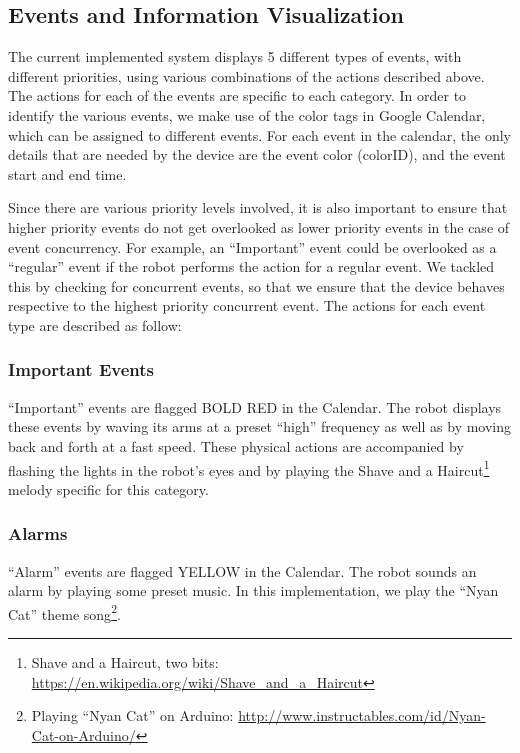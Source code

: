 \documentclass{sigchi-ext}
\begin{document}
\subsection{Events and Information Visualization}

The current implemented system displays 5 different types of events, with
different priorities, using various combinations of the actions described
above. The actions for each of the events are specific to each category. In
order to identify the various events, we make use of the color tags in Google
Calendar, which can be assigned to different events. For each event in the
calendar, the only details that are needed by the device are the event color
(colorID), and the event start and end time.

Since there are various priority levels involved, it is also important to
ensure that higher priority events do not get overlooked as lower priority
events in the case of event concurrency. For example, an ``Important'' event
could be overlooked as a ``regular'' event if the robot performs the action for
a regular event. We tackled this by checking for concurrent events, so that we
ensure that the device behaves respective to the highest priority concurrent
event. The actions for each event type are described as follow:

\subsubsection{Important Events}

``Important'' events are flagged BOLD RED in the Calendar. The robot displays
these events by waving its arms at a preset ``high'' frequency as well as by
moving back and forth at a fast speed. These physical actions are accompanied
by flashing the lights in the robot's eyes and by playing the Shave and a
Haircut\footnote{Shave and a Haircut, two bits:
  \url{https://en.wikipedia.org/wiki/Shave\_and\_a\_Haircut}} melody specific for this
category.

\subsubsection{Alarms}

``Alarm'' events are flagged YELLOW in the Calendar. The robot sounds an alarm by
playing some preset music. In this implementation, we play the ``Nyan Cat''
theme song\footnote{Playing ``Nyan Cat'' on Arduino:
  \url{http://www.instructables.com/id/Nyan-Cat-on-Arduino/}}. 
\end{document}
